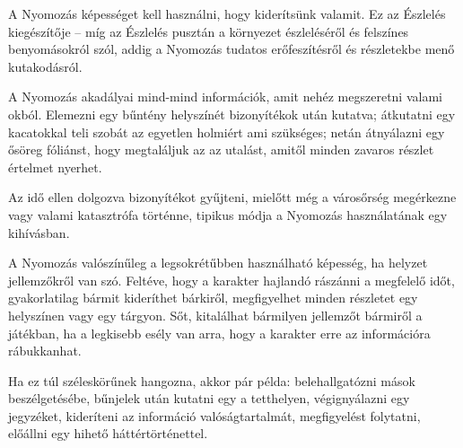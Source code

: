 
A Nyomozás képességet kell használni, hogy kiderítsünk valamit. Ez az Észlelés kiegészítője -- míg az Észlelés pusztán a környezet észleléséről és felszínes benyomásokról szól, addig a Nyomozás tudatos erőfeszítésről és részletekbe menő kutakodásról.

\overcome A Nyomozás akadályai mind-mind információk, amit nehéz megszeretni valami okból. Elemezni egy bűntény helyszínét bizonyítékok után kutatva; átkutatni egy kacatokkal teli szobát az egyetlen holmiért ami szükséges; netán átnyálazni egy ősöreg fóliánst, hogy megtaláljuk az az utalást, amitől minden zavaros részlet értelmet nyerhet.

Az idő ellen dolgozva bizonyítékot gyűjteni, mielőtt még a városőrség megérkezne vagy valami katasztrófa történne, tipikus módja a Nyomozás használatának egy kihívásban.

\advantage A Nyomozás valószínűleg a legsokrétűbben használható képesség, ha helyzet jellemzőkről van szó. Feltéve, hogy a karakter hajlandó rászánni a megfelelő időt, gyakorlatilag bármit kideríthet bárkiről, megfigyelhet minden részletet egy helyszínen vagy egy tárgyon. Sőt, kitalálhat bármilyen jellemzőt bármiről a játékban, ha a legkisebb esély van arra, hogy a karakter erre az információra rábukkanhat.

Ha ez túl széleskörűnek hangozna, akkor pár példa: belehallgatózni mások beszélgetésébe, bűnjelek után kutatni egy a tetthelyen, végignyálazni egy jegyzéket, kideríteni az információ valóságtartalmát, megfigyelést folytatni, előállni egy hihető háttértörténettel.

\noattackatall
 
\nodefendatall



